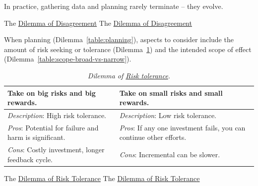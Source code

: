 In practice, gathering data and planning rarely terminate -- they evolve.

The \href{table:opposition}{Dilemma of Disagreement}
The \href{table:opposition}{Dilemma of Disagreement}



When planning (Dilemma~\ref{table:planning}), aspects to consider include
the amount of risk seeking or tolerance (Dilemma~\ref{table:risk})
and
the intended scope of effect  (Dilemma~\ref{table:scope-broad-vs-narrow}).

\begin{center}
\begin{table}[H] %
\begin{tabular}{ | m{\dilemmatablewidth}| m{\dilemmatablewidth} | } 
  \hline
  \textbf{Take on big risks and big rewards.} & 
  \textbf{Take on small risks and small rewards.} \\ 
  \hline
  \textit{Description}: High risk tolerance. &
  \textit{Description}: Low risk tolerance. \\
  \hline
  \textit{Pros}: Potential for failure and harm is significant. &
  \textit{Pros}: If any one investment fails, you can continue other efforts. \\
  \hline
  \textit{Cons}: Costly investment, longer feedback cycle. & 
  \textit{Cons}: Incremental can be slower. \\
  \hline
\end{tabular}
\caption{
\textit{Dilemma of \href{https://en.wikipedia.org/wiki/Risk_assessment}{Risk tolerance}.} 
}
\label{table:risk}
\end{table}
\end{center}

The \href{table:risk}{Dilemma of Risk Tolerance}
The \href{table:risk}{Dilemma of Risk Tolerance}


